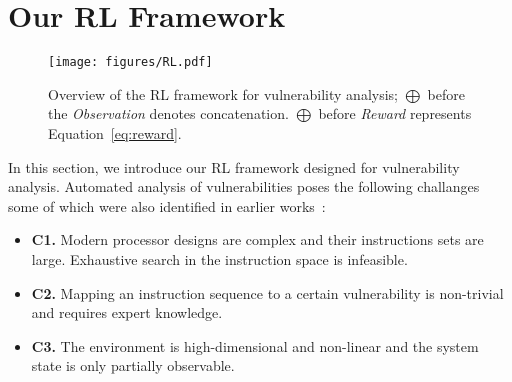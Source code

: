 \section{Our RL Framework}

\begin{figure*}
    \centering
    \texttt{[image: figures/RL.pdf]}
    \caption{\label{fig:rl_framework}Overview of the RL framework for \Mi vulnerability analysis; $\bigoplus$ before the \textit{Observation} denotes concatenation. $\bigoplus$ before \textit{Reward} represents Equation~\ref{eq:reward}.}
\end{figure*}

In this section, we introduce our RL framework designed for \Mi vulnerability analysis.
Automated analysis of \Mi vulnerabilities poses the following challanges some of which were also identified in earlier works~\cite{weber2021osiris,moghimi2020medusa,chakraborty2024shesha}:

\begin{itemize}[nosep, leftmargin=*]
\item \textbf{C1.} Modern processor designs are complex and their instructions sets are large. Exhaustive search in the instruction space is infeasible. %
\item \textbf{C2.} Mapping an instruction sequence to a certain \Mi vulnerability is non-trivial and requires expert knowledge. %
\item \textbf{C3.} The environment is high-dimensional and non-linear and the system state is only partially observable. %
\end{itemize}


